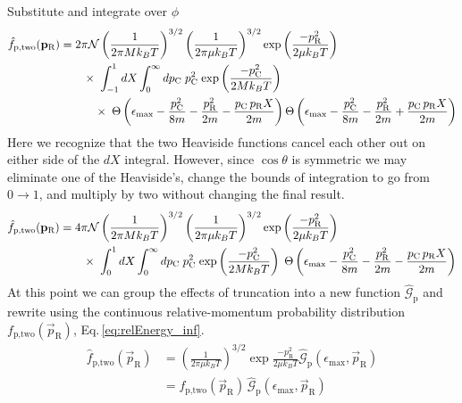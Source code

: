 Substitute and integrate over $\phi$
\begin{equation}
\begin{split}
	 \hat{f}_\text{p,two}(\mathbf{p}_{\text{R}}) &= 2 \pi \mathcal{N} \left(\frac{1}{2 \pi M k_B T}\right)^{3/2} \left(\frac{1}{2 \pi \mu k_B T}\right)^{3/2} \text{exp}\left( {\frac{-p_\text{R}^2}{2 \mu k_B T}} \right) \\
	 &\quad\quad \times \; \int_{-1}^1 dX \int_0^{\infty} dp_\text{C} \; p_\text{C}^2 \; \text{exp}\left( {\frac{-p_\text{C}^2}{2 M k_B T}} \right) \\ 
	 &\quad\quad\quad \times \; \Theta \left( {\epsilon_\text{max} - \frac{p_\text{C}^2}{8m} - \frac{p_\text{R}^2}{2m} - \frac{p_\text{C} \, p_\text{R} X}{2m}} \right) \Theta \left( {\epsilon_\text{max} - \frac{p_\text{C}^2}{8m} - \frac{p_\text{R}^2}{2m} + \frac{p_\text{C} \, p_\text{R} X}{2m}} \right) 
\end{split}
\end{equation}
Here we recognize that the two Heaviside functions cancel each other out on either side of the $dX$ integral.
However, since $\cos\theta$ is symmetric we may eliminate one of the Heaviside's, change the bounds of integration to go from $0 \rightarrow 1$, and multiply by two without changing the final result.
\begin{equation}
\begin{split}
	 \hat{f}_\text{p,two}(\mathbf{p}_{\text{R}}) &= 4 \pi \mathcal{N} \left(\frac{1}{2 \pi M k_B T}\right)^{3/2} \left(\frac{1}{2 \pi \mu k_B T}\right)^{3/2} \text{exp}\left( {\frac{-p_\text{R}^2}{2 \mu k_B T}} \right) \\
	 &\quad\quad \times \; \int_{0}^1 dX \int_0^{\infty} dp_\text{C} \; p_\text{C}^2 \; \text{exp}\left( {\frac{-p_\text{C}^2}{2 M k_B T}} \right) \; \Theta \left( {\epsilon_\text{max} - \frac{p_\text{C}^2}{8m} - \frac{p_\text{R}^2}{2m} - \frac{p_\text{C} \, p_\text{R} X}{2m}} \right)
\end{split}
\end{equation}
At this point we can group the effects of truncation into a new function $\hat{\mathcal{G}}_\text{p}$ and rewrite using the continuous relative-momentum probability distribution $f_\text{p,two}(\vec{p}_\text{R})$, Eq.\,\ref{eq:relEnergy_inf}.
\begin{equation}
\begin{split}
	 \hat{f}_\text{p,two}(\vec{p}_{\text{R}}) &= \left(\frac{1}{2 \pi \mu k_B T}\right)^{3/2} \exp{\frac{-p_\text{R}^2}{2 \mu k_B T}} \hat{\mathcal{G}}_\text{p}(\epsilon_\text{max}, \vec{p}_\text{R}) \\
	 &= f_\text{p,two}(\vec{p}_\text{R}) \, \hat{\mathcal{G}}_\text{p}(\epsilon_\text{max}, \vec{p}_\text{R})
\end{split}
\end{equation}

